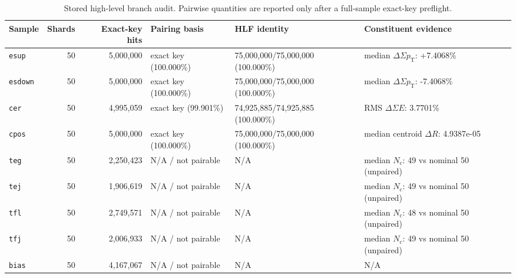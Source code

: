\begin{table}[!ht]
\centering\footnotesize
\caption{Stored high-level branch audit. Pairwise quantities are reported only after a full-sample exact-key preflight.}
\begin{tabular}{lrrlll}
\toprule
Sample & Shards & Exact-key hits & Pairing basis & HLF identity & Constituent evidence \\
\midrule
\texttt{esup} & 50 & 5{,}000{,}000 & exact key (100.000\%) & 75{,}000{,}000/75{,}000{,}000 (100.000\%) & median $\Delta\Sigma p_{\mathrm T}$: +7.4068\% \\
\texttt{esdown} & 50 & 5{,}000{,}000 & exact key (100.000\%) & 75{,}000{,}000/75{,}000{,}000 (100.000\%) & median $\Delta\Sigma p_{\mathrm T}$: -7.4068\% \\
\texttt{cer} & 50 & 4{,}995{,}059 & exact key (99.901\%) & 74{,}925{,}885/74{,}925{,}885 (100.000\%) & RMS $\Delta\Sigma E$: 3.7701\% \\
\texttt{cpos} & 50 & 5{,}000{,}000 & exact key (100.000\%) & 75{,}000{,}000/75{,}000{,}000 (100.000\%) & median centroid $\Delta R$: 4.9387e-05 \\
\texttt{teg} & 50 & 2{,}250{,}423 & N/A / not pairable & N/A & median $N_{\mathrm c}$: 49 vs nominal 50 (unpaired) \\
\texttt{tej} & 50 & 1{,}906{,}619 & N/A / not pairable & N/A & median $N_{\mathrm c}$: 49 vs nominal 50 (unpaired) \\
\texttt{tfl} & 50 & 2{,}749{,}571 & N/A / not pairable & N/A & median $N_{\mathrm c}$: 48 vs nominal 50 (unpaired) \\
\texttt{tfj} & 50 & 2{,}006{,}933 & N/A / not pairable & N/A & median $N_{\mathrm c}$: 49 vs nominal 50 (unpaired) \\
\texttt{bias} & 50 & 4{,}167{,}067 & N/A / not pairable & N/A & N/A \\
\bottomrule
\end{tabular}
\end{table}

